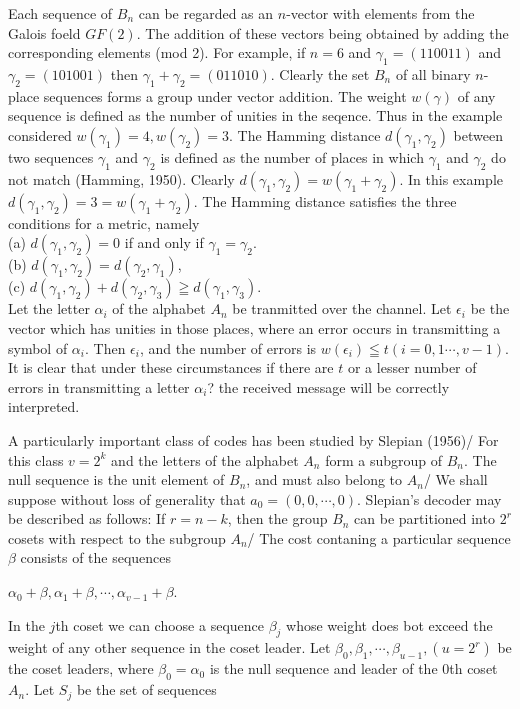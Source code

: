 \documentclass{article}
\begin{document}
Each sequence of $B_n$ can be regarded as an $n$-vector with elements from the Galois foeld $GF(2)$. The addition of these vectors being obtained by adding the corresponding elements (mod 2). For example, if $n=6$ and $\gamma_1=(110011)$ and $\gamma_2=(101001)$ then $\gamma_1+\gamma_2=(011010)$. Clearly the set $B_n$ of all binary $n$-place sequences forms a group under vector addition. The weight $w(\gamma)$ of any sequence is defined as the number of unities in the seqence. Thus in the example considered $w(\gamma_1)=4, w(\gamma_2)=3$. The Hamming distance $d(\gamma_1, \gamma_2)$ between two sequences $\gamma_1$ and $\gamma_2$ is defined as the number of places in which $\gamma_1$ and $\gamma_2$ do not match (Hamming, 1950). Clearly $d(\gamma_1, \gamma_2)=w(\gamma_1+\gamma_2)$. In this example $d(\gamma_1, \gamma_2)=3=w(\gamma_1+\gamma_2)$. The Hamming distance satisfies the three conditions for a metric, namely\\
(a) $d(\gamma_1, \gamma_2)=0$ if and only if $\gamma_1=\gamma_2$.\\
(b) $d(\gamma_1, \gamma_2)=d(\gamma_2, \gamma_1)$,\\
(c) $d(\gamma_1, \gamma_2)+d(\gamma_2, \gamma_3) \geqq d(\gamma_1, \gamma_3)$.\\

Let the letter $\alpha_i$ of the alphabet $A_n$ be tranmitted over the channel. Let $\epsilon_i$ be the vector which has unities in those places, where an error occurs in transmitting a symbol of $\alpha_i$. Then $\epsilon_i$, and the number of errors is $w(\epsilon_i)\leqq t(i=0,1\cdots,v-1)$. It is clear that under these circumstances if there are $t$ or a lesser number of errors in transmitting a letter $\alpha_i$? the received message will be correctly interpreted.

A particularly important class of codes has been studied by Slepian (1956)/ For this class $v=2^k$ and the letters of the alphabet $A_n$ form a subgroup of $B_n$. The null sequence is the unit element of $B_n$, and must also belong to $A_n$/ We shall suppose without loss of generality that $a_0=(0,0,\cdots,0)$. Slepian's decoder may be described as follows: If $r=n-k$, then the group $B_n$ can be partitioned into $2^r$ cosets with respect to the subgroup $A_n$/ The cost contaning a particular sequence $\beta$ consists of the sequences 

$\alpha_0+\beta,\alpha_1+\beta,\cdots,\alpha_{v-1}+\beta$.

In the $j$th coset we can choose a sequence $\beta_j$ whose weight does bot exceed the weight of any other sequence in the coset leader. Let $\beta_0,\beta_1,\cdots,\beta_{u-1},(u=2^r)$ be the coset leaders, where $\beta_0=\alpha_0$ is the null sequence and leader of the 0th coset $A_n$. Let $S_j$ be the set of sequences
\end{document}

